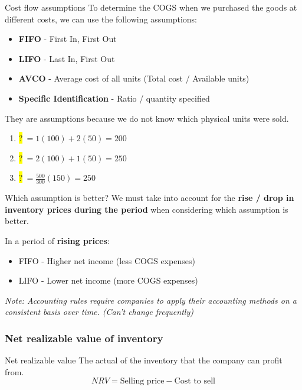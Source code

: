 \begin{theorem}
    {Cost flow assumptions}
    To determine the COGS when we purchased the goods at different costs, we can use the following assumptions:
    \begin{itemize}
        \item \textbf{FIFO} - First In, First Out
        \item \textbf{LIFO} - Last In, First Out
        \item \textbf{AVCO} - Average cost of all units (Total cost / Available units)
        \item \textbf{Specific Identification} - Ratio / quantity specified
    \end{itemize}
    They are assumptions because we do not know which physical units were sold.
    \tcblower
    \begin{enumerate}
        \item \colorbox{yellow}{?}$\ =1(100)+2(50)=200$
        \item \colorbox{yellow}{?}$\ =2(100)+1(50)=250$
        \item \colorbox{yellow}{?}$\ =\frac{500}{300}(150)=250$
    \end{enumerate}
\end{theorem}
\label{thm:cost_flow}

\begin{knBox}
    {Which assumption is better?}
    We must take into account for the \textbf{rise / drop in inventory prices during the period} when considering which assumption is better.

    In a period of \textbf{rising prices}:
    \begin{itemize}
        \item FIFO - Higher net income (less COGS expenses)
        \item LIFO - Lower net income (more COGS expenses)
    \end{itemize}
    \textit{Note: Accounting rules require companies to apply their accounting methods on a consistent basis over time. (Can't change frequently)}
\end{knBox}

\subsubsection{Net realizable value of inventory}

\begin{definition}
    {Net realizable value}
    The actual of the inventory that the company can profit from.
    \[NRV = \text{Selling price} - \text{Cost to sell}\]
\end{definition}

